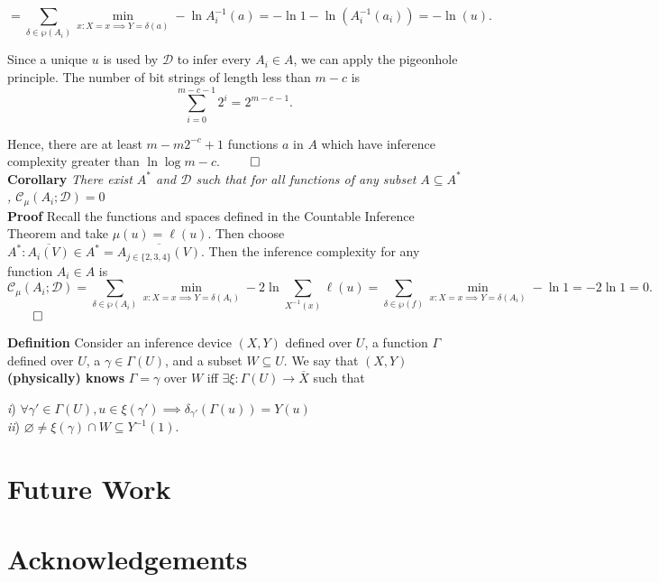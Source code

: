 \documentclass[11pt]{article}
\let\emptyset\varnothing
\begin{document}
$$ = \sum_{\delta \in \wp(A_i)} \min_{x : X = x \implies Y = \delta(a) } - \ln {A_i^{-1}(a)} = - \ln 1 - \ln(A_i^{-1}(a_i))  = - \ln(u). $$

Since a unique $ u $ is used by $ \mathcal{D} $ to infer every $ A_i \in A $, we can apply the pigeonhole principle. The number of bit strings of length less than $ m - c $ is 
$$ \sum_{i = 0}^{m - c - 1} {2^i} = 2^{m - c - 1}. $$

Hence, there are at least $ m - m2^{-c} + 1 $ functions $ a $ in $ A $ which have inference complexity greater than $ \ln \log m - c $. $ \hfill \qed $ \\


\textbf{Corollary} \; \textit{ There exist $ A^{*} $ and $ \mathcal{D} $ such that for all functions of any subset $ A \subseteq A^{*} $, $ \mathcal{C}_{\mu}(A_i ; \mathcal{D}) = 0 $ } \\
\textbf{Proof} \quad 
Recall the functions and spaces defined in the Countable Inference Theorem and take $ \mu(u) = \ell (u) $. Then choose $ A^{*}: \overline{A_ i(V)} \in A^{*} = \overline{A_{j \in \{2, 3, 4\}}(V)} $. Then the inference complexity for any function $ A_i \in A $ is 
$$ \mathcal{C}_{\mu}(A_i ; \mathcal{D}) = \sum_{\delta \in \wp(A_i)} \min_{x : X = x \implies Y = \delta(A_i) } - 2 \ln \sum_{X^{-1}(x)} {\ell(u)} = \sum_{\delta \in \wp(f)} \min_{x : X = x \implies Y = \delta(A_i) } - \ln {1}  = - 2 \ln {1} = 0. $$
$ \hfill \qed $

\textbf{Definition} \quad Consider an inference device $ (X, Y) $ defined over $ U $, a function $ \Gamma $ defined over $ U $, a $ \gamma \in \Gamma(U) $, and a subset $ W \subseteq U $. We say that $ (X, Y) $ \textbf{(physically) knows} $ \Gamma = \gamma $ over $ W $ iff $\exists \xi : \Gamma(U) \rightarrow \overline{X} $ such that 

\textit{i}) $ \forall \gamma' \in \Gamma(U), u \in \xi(\gamma') \implies \delta_{\gamma'}(\Gamma(u)) = Y(u) $ \\ 
\textit{ii}) $ \emptyset \neq \xi(\gamma) \cap W \subseteq Y^{-1}(1). $ \\

\newpage
\section{Future Work}
\newpage
\section{Acknowledgements}
\end{document}
